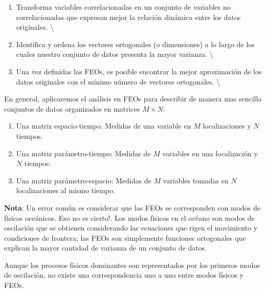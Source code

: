 \documentclass[
]{agujournal2019}
\begin{document}
\begin{enumerate}
\def\labelenumi{(\roman{enumi})}
\item
  Transforma variables correlacionadas en un conjunto de variables no
  correlacionadas que expresan mejor la relación dinámica entre los
  datos originales. \textbackslash{}
\item
  Identifica y ordena los vectores ortogonales (o dimensiones) a lo
  largo de los cuales nuestro conjunto de datos presenta la mayor
  varianza. \textbackslash{}
\item
  Una vez definidas las FEOs, es posible encontrar la mejor aproximación
  de los datos originales con el mínimo número de vectores ortogonales.
  \textbackslash{}
\end{enumerate}

\vspace{0.25cm}

En general, aplicaremos el análisis en FEOs para describir de manera mas
sencilla conjuntos de datos organizados en matrices \(M\times N\):\\

\begin{enumerate}
\def\labelenumi{(\arabic{enumi})}
\item
  Una matriz espacio-tiempo: Medidas de una variable en \(M\)
  localizaciones y \(N\) tiempos.\\
\item
  Una matriz parámetro-tiempo: Medidas de \(M\) variables en una
  localización y \(N\) tiempos.\\
\item
  Una matriz parámetro-espacio: Medidas de \(M\) variables tomadas en
  \(N\) localizaciones al mismo tiempo.\\
\end{enumerate}

\textbf{Nota}: Un error común es considerar que las FEOs se corresponden
con modos de físicos oceánicos. Eso no es cierto!. Los modos físicos en
el océano son modos de oscilación que se obtienen considerando las
ecuaciones que rigen el movimiento y condiciones de frontera; las FEOs
son simplemente funciones ortogonales que explican la mayor cantidad de
varianza de un conjunto de datos.

Aunque los procesos físicos dominantes son representados por los
primeros modos de oscilación, no existe una correspondencia uno a uno
entre modos físicos y FEOs.

\vspace{0.25cm}
\end{document}

